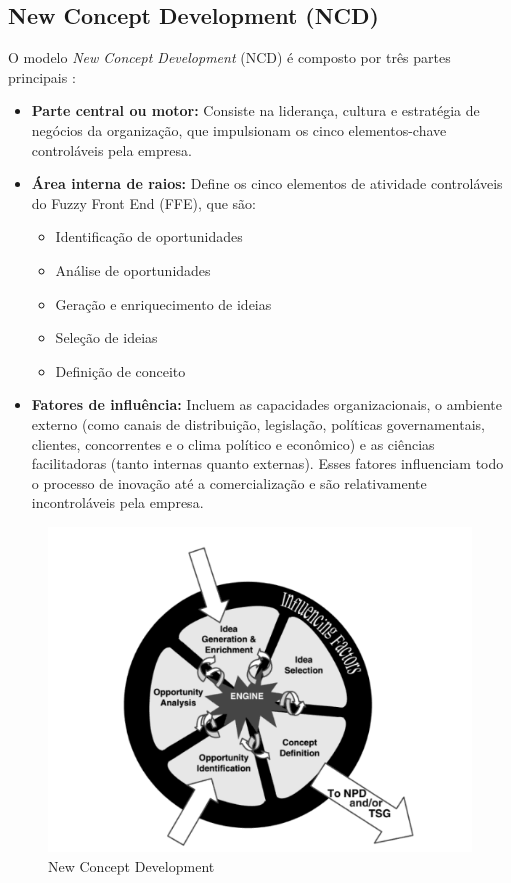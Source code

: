 \subsection{New Concept Development (NCD)}

O modelo \textit{New Concept Development} (NCD) é composto por três partes principais \parencite{BOOK01}:

\begin{itemize}
    \item \textbf{Parte central ou motor:} Consiste na liderança, cultura e estratégia de negócios da organização, que impulsionam os cinco elementos-chave controláveis pela empresa.
    
    \item \textbf{Área interna de raios:} Define os cinco elementos de atividade controláveis do Fuzzy Front End (FFE), que são: 
    \begin{itemize}
        \item Identificação de oportunidades
        \item Análise de oportunidades
        \item Geração e enriquecimento de ideias
        \item Seleção de ideias
        \item Definição de conceito
    \end{itemize}

    \item \textbf{Fatores de influência:} Incluem as capacidades organizacionais, o ambiente externo (como canais de distribuição, legislação, políticas governamentais, clientes, concorrentes e o clima político e econômico) e as ciências facilitadoras (tanto internas quanto externas). Esses fatores influenciam todo o processo de inovação até a comercialização e são relativamente incontroláveis pela empresa.
\end{itemize}

\begin{figure}[h]
    \centering
    \includegraphics[scale=0.5]{ch03/assets/new-concept-development.png}
    \decoRule
    \caption[New Concept Development]{New Concept Development \parencite{BOOK01}}
    \label{fig:ch02-inovation-process}
\end{figure}

